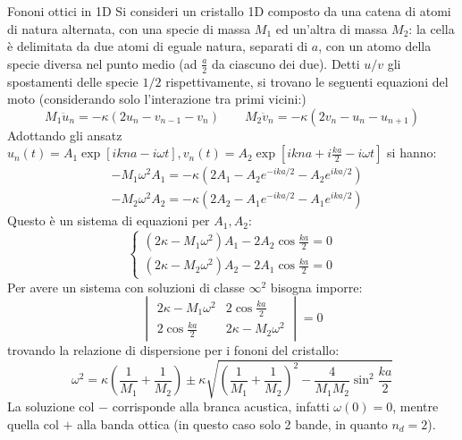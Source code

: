 \begin{example}{Fononi ottici in 1D}{}
	Si consideri un cristallo 1D composto da una catena di atomi di natura alternata, con una specie di massa $ M_1 $ ed un'altra di massa $ M_2 $: la cella è delimitata da due atomi di eguale natura, separati di $ a $, con un atomo della specie diversa nel punto medio (ad $ \frac{a}{2} $ da ciascuno dei due). Detti $ u / v $ gli spostamenti delle specie $ 1 / 2 $ rispettivamente, si trovano le seguenti equazioni del moto (considerando solo l'interazione tra primi vicini:)
	\begin{equation*}
		M_1 \ddot{u}_n = -\kappa \left( 2u_n - v_{n-1} - v_{n} \right)
		\qquad
		M_2 \ddot{v}_n = -\kappa \left( 2v_n - u_n - u_{n+1} \right)
	\end{equation*}
	Adottando gli ansatz $ u_n(t) = A_1 \exp \left[ i k n a - i \omega t \right] , v_n(t) = A_2 \exp \left[ i k n a + i \frac{ka}{2} - i \omega t \right] $ si hanno:
	\begin{equation*}
		\begin{split}
			& - M_1 \omega^2 A_1 = - \kappa \left( 2A_1 - A_2 e^{-i ka/2} - A_2 e^{i ka/2} \right) \\
			& - M_2 \omega^2 A_2 = - \kappa \left( 2 A_2 - A_1 e^{-i ka/2} - A_1 e^{i ka/2} \right)
		\end{split}
	\end{equation*}
	Questo è un sistema di equazioni per $ A_1 , A_2 $:
	\begin{equation*}
		\begin{cases}
			\left( 2\kappa - M_1 \omega^2 \right) A_1 - 2 A_2 \cos \frac{ka}{2} = 0 \\
			\left( 2\kappa - M_2 \omega^2 \right) A_2 - 2 A_1 \cos \frac{ka}{2} = 0
		\end{cases}
	\end{equation*}
	Per avere un sistema con soluzioni di classe $ \infty^2 $ bisogna imporre:
	\begin{equation*}
		\begin{vmatrix}
			2\kappa - M_1 \omega^2 & 2 \cos \frac{ka}{2} \\
			2 \cos \frac{ka}{2} & 2\kappa - M_2 \omega^2
		\end{vmatrix}
		= 0
	\end{equation*}
	trovando la relazione di dispersione per i fononi del cristallo:
	\begin{equation}
		\omega^2 = \kappa \left( \frac{1}{M_1} + \frac{1}{M_2} \right) \pm \kappa \sqrt{\left( \frac{1}{M_1} + \frac{1}{M_2} \right)^2 - \frac{4}{M_1 M_2} \sin^2 \frac{ka}{2}}
	\end{equation}
	La soluzione col $ - $ corrisponde alla branca acustica, infatti $ \omega(0) = 0 $, mentre quella col $ + $ alla banda ottica (in questo caso solo 2 bande, in quanto $ n_d = 2 $).
\end{example}

